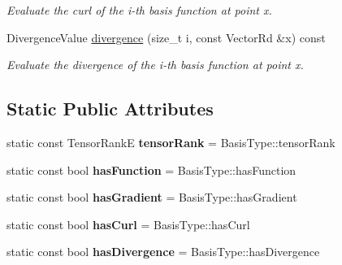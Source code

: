 \begin{DoxyCompactItemize}
\begin{DoxyCompactList}\small\item\em Evaluate the curl of the i-\/th basis function at point x. \end{DoxyCompactList}\item 
\mbox{\label{classHArDCore2D_1_1ShiftedBasis_a84d8719be3260330c3c2e80dbf1b4eed}} 
Divergence\+Value \hyperlink{classHArDCore2D_1_1ShiftedBasis_a84d8719be3260330c3c2e80dbf1b4eed}{divergence} (size\+\_\+t i, const Vector\+Rd \&x) const
\begin{DoxyCompactList}\small\item\em Evaluate the divergence of the i-\/th basis function at point x. \end{DoxyCompactList}\end{DoxyCompactItemize}
\subsection*{Static Public Attributes}
\begin{DoxyCompactItemize}
\item 
\mbox{\label{classHArDCore2D_1_1ShiftedBasis_a699c8451fd81d74301b1a2513ae34df0}} 
static const Tensor\+RankE {\bfseries tensor\+Rank} = Basis\+Type\+::tensor\+Rank
\item 
\mbox{\label{classHArDCore2D_1_1ShiftedBasis_a0c9b0469e3a9a1d2de82c3a0a5d362f0}} 
static const bool {\bfseries has\+Function} = Basis\+Type\+::has\+Function
\item 
\mbox{\label{classHArDCore2D_1_1ShiftedBasis_af7af9068680c10bc140e0d7273e451c8}} 
static const bool {\bfseries has\+Gradient} = Basis\+Type\+::has\+Gradient
\item 
\mbox{\label{classHArDCore2D_1_1ShiftedBasis_abac4d77a31c51c6a10406a87fb051bcb}} 
static const bool {\bfseries has\+Curl} = Basis\+Type\+::has\+Curl
\item 
\mbox{\label{classHArDCore2D_1_1ShiftedBasis_af6705a2937e7d47cadffd9a36e8a7371}} 
static const bool {\bfseries has\+Divergence} = Basis\+Type\+::has\+Divergence
\end{DoxyCompactItemize}


